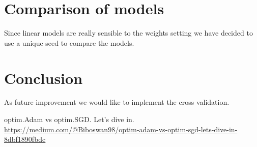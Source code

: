 \documentclass[journal, a4paper]{IEEEtran}
\begin{document}
\section{Comparison of models}
\label{sec:comparison}
Since linear models are really sensible to the weights setting 
we have decided to use a unique seed to compare the models.


\section{Conclusion}
\label{sec:conclusion}
As future improvement we would like to implement the cross validation.



\begin{thebibliography}{999}

    	optim.Adam vs optim.SGD. Let’s dive in.
    	\url{https://medium.com/@Biboswan98/optim-adam-vs-optim-sgd-lets-dive-in-8dbf1890fbdc}
	
	    

\end{thebibliography}

\end{document}
